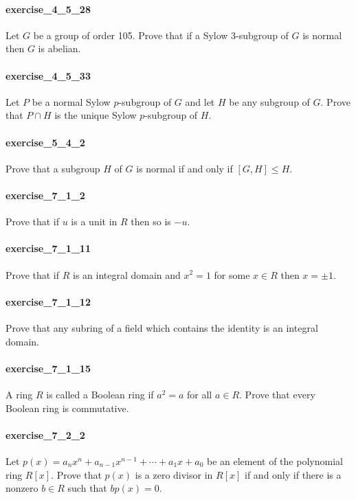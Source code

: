 \documentclass{article}
\begin{document}
\paragraph{exercise\_4\_5\_28} Let $G$ be a group of order 105. Prove that if a Sylow 3-subgroup of $G$ is normal then $G$ is abelian.

\paragraph{exercise\_4\_5\_33} Let $P$ be a normal Sylow $p$-subgroup of $G$ and let $H$ be any subgroup of $G$. Prove that $P \cap H$ is the unique Sylow $p$-subgroup of $H$.

\paragraph{exercise\_5\_4\_2} Prove that a subgroup $H$ of $G$ is normal if and only if $[G, H] \leq H$.

\paragraph{exercise\_7\_1\_2} Prove that if $u$ is a unit in $R$ then so is $-u$.

\paragraph{exercise\_7\_1\_11} Prove that if $R$ is an integral domain and $x^{2}=1$ for some $x \in R$ then $x=\pm 1$.

\paragraph{exercise\_7\_1\_12} Prove that any subring of a field which contains the identity is an integral domain.

\paragraph{exercise\_7\_1\_15} A ring $R$ is called a Boolean ring if $a^{2}=a$ for all $a \in R$. Prove that every Boolean ring is commutative.

\paragraph{exercise\_7\_2\_2} Let $p(x)=a_{n} x^{n}+a_{n-1} x^{n-1}+\cdots+a_{1} x+a_{0}$ be an element of the polynomial ring $R[x]$. Prove that $p(x)$ is a zero divisor in $R[x]$ if and only if there is a nonzero $b \in R$ such that $b p(x)=0$.
\end{document}
